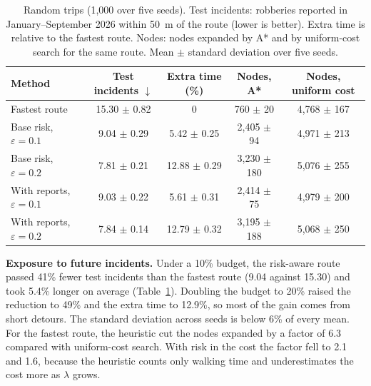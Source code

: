 \documentclass{article}
\begin{document}
\begin{table}[t]
  \caption{Random trips (1,000 over five seeds). Test incidents: robberies reported in
  January--September 2026 within 50~m of the route (lower is better). Extra time is relative to
  the fastest route. Nodes: nodes expanded by A* and by uniform-cost search for the same route.
  Mean $\pm$ standard deviation over five seeds.}
  \label{tab:results}
  \centering
  \small
  \begin{tabular}{lcccc}
    \toprule
    Method & Test incidents $\downarrow$ & Extra time (\%) & Nodes, A* & Nodes, uniform cost \\
    \midrule
    Fastest route & 15.30 $\pm$ 0.82 & 0 & 760 $\pm$ 20 & 4,768 $\pm$ 167 \\
    Base risk, $\varepsilon=0.1$ & 9.04 $\pm$ 0.29 & 5.42 $\pm$ 0.25 & 2,405 $\pm$ 94 & 4,971 $\pm$ 213 \\
    Base risk, $\varepsilon=0.2$ & 7.81 $\pm$ 0.21 & 12.88 $\pm$ 0.29 & 3,230 $\pm$ 180 & 5,076 $\pm$ 255 \\
    With reports, $\varepsilon=0.1$ & 9.03 $\pm$ 0.22 & 5.61 $\pm$ 0.31 & 2,414 $\pm$ 75 & 4,979 $\pm$ 200 \\
    With reports, $\varepsilon=0.2$ & 7.84 $\pm$ 0.14 & 12.79 $\pm$ 0.32 & 3,195 $\pm$ 188 & 5,068 $\pm$ 250 \\
    \bottomrule
  \end{tabular}
\end{table}

\textbf{Exposure to future incidents.} Under a 10\% budget, the risk-aware route passed 41\% fewer
test incidents than the fastest route (9.04 against 15.30) and took 5.4\% longer on average
(Table~\ref{tab:results}). Doubling the budget to 20\% raised the reduction to 49\% and the extra
time to 12.9\%, so most of the gain comes from short detours. The standard deviation across seeds
is below 6\% of every mean. For the fastest route, the heuristic cut the nodes expanded by a factor
of 6.3 compared with uniform-cost search. With risk in the cost the factor fell to 2.1 and 1.6,
because the heuristic counts only walking time and underestimates the cost more as $\lambda$
grows.
\end{document}
